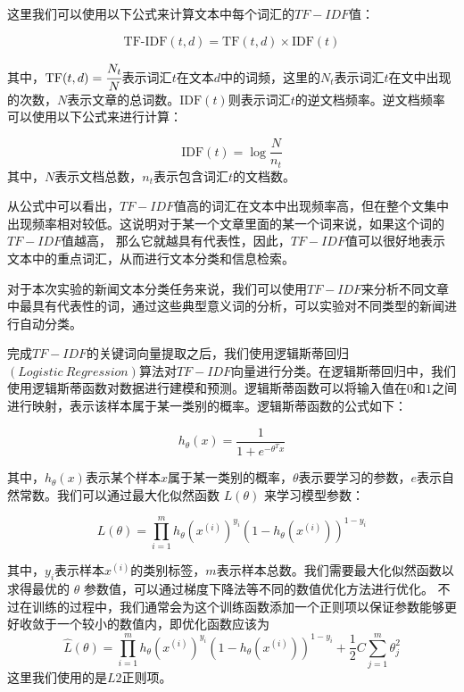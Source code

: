\documentclass{article}
\begin{document}
这里我们可以使用以下公式来计算文本中每个词汇的$TF-IDF$值：

\begin{equation}
\text{TF-IDF}(t,d) = \text{TF}(t,d) \times \text{IDF}(t)
\end{equation}

其中，$\text{TF}(t,d)=\cfrac{N_t}{N}$表示词汇$t$在文本$d$中的词频，这里的$N_t$表示词汇$t$在文中出现的次数，$N$表示文章的总词数。$\text{IDF}(t)$则表示词汇$t$的逆文档频率。逆文档频率可以使用以下公式来进行计算：

\begin{equation}
\text{IDF}(t) = \log\frac{N}{n_t}
\end{equation}
其中，$N$表示文档总数，$n_t$表示包含词汇$t$的文档数。

从公式中可以看出，$TF-IDF$值高的词汇在文本中出现频率高，但在整个文集中出现频率相对较低。这说明对于某一个文章里面的某一个词来说，如果这个词的$TF-IDF$值越高，
那么它就越具有代表性，因此，$TF-IDF$值可以很好地表示文本中的重点词汇，从而进行文本分类和信息检索。

对于本次实验的新闻文本分类任务来说，我们可以使用$TF-IDF$来分析不同文章中最具有代表性的词，通过这些典型意义词的分析，可以实验对不同类型的新闻进行自动分类。

完成$TF-IDF$的关键词向量提取之后，我们使用逻辑斯蒂回归$(Logistic\ Regression)$算法对$TF-IDF$向量进行分类。在逻辑斯蒂回归中，我们使用逻辑斯蒂函数对数据进行建模和预测。逻辑斯蒂函数可以将输入值在$0$和$1$之间进行映射，表示该样本属于某一类别的概率。逻辑斯蒂函数的公式如下：

\begin{equation}
h_{\theta}(x)=\frac{1}{1+e^{-\theta^Tx}}
\end{equation}

其中，$h_\theta(x)$表示某个样本$x$属于某一类别的概率，$\theta$表示要学习的参数，$e$表示自然常数。我们可以通过最大化似然函数 $L(\theta)$ 来学习模型参数：

\begin{equation}
L(\theta)=\prod_{i=1}^{m}h_{\theta}(x^{(i)})^{y_i}(1-h_{\theta}(x^{(i)}))^{1-y_i}
\end{equation}

其中，$y_i$表示样本$x^{(i)}$的类别标签，$m$表示样本总数。我们需要最大化似然函数以求得最优的 $\theta$ 参数值，可以通过梯度下降法等不同的数值优化方法进行优化。
不过在训练的过程中，我们通常会为这个训练函数添加一个正则项以保证参数能够更好收敛于一个较小的数值内，即优化函数应该为
\begin{equation}
    \hat{L}(\theta)=\prod_{i=1}^{m}h_{\theta}(x^{(i)})^{y_i}(1-h_{\theta}(x^{(i)}))^{1-y_i}+\frac{1}{2}C\sum_{j=1}^{m}\theta_j^2
\end{equation}
这里我们使用的是$L2$正则项。
\end{document}
